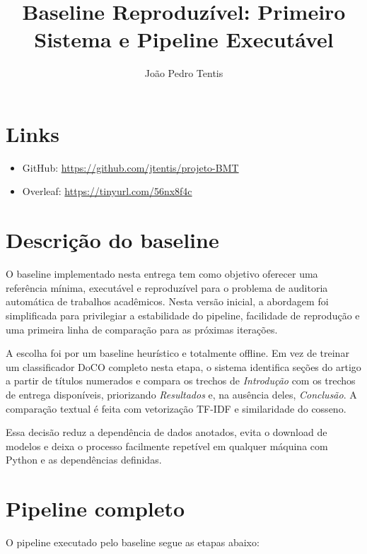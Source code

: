 \documentclass[12pt]{article}
\title{\textbf{Baseline Reproduzível: Primeiro Sistema e Pipeline Executável}}
\author{João Pedro Tentis\inst{1}}
\begin{document}
 

\maketitle

\section{Links}

\begin{itemize}
    \item GitHub: \url{https://github.com/jtentis/projeto-BMT}
    \item Overleaf: \url{https://tinyurl.com/56nx8f4c}
\end{itemize}

\section{Descrição do baseline}

O baseline implementado nesta entrega tem como objetivo oferecer uma referência mínima, executável e reproduzível para o problema de auditoria automática de trabalhos acadêmicos. Nesta versão inicial, a abordagem foi simplificada para privilegiar a estabilidade do pipeline, facilidade de reprodução e uma primeira linha de comparação para as próximas iterações.

A escolha foi por um baseline heurístico e totalmente offline. Em vez de treinar um classificador DoCO completo nesta etapa, o sistema identifica seções do artigo a partir de títulos numerados e compara os trechos de \textit{Introdução} com os trechos de entrega disponíveis, priorizando \textit{Resultados} e, na ausência deles, \textit{Conclusão}. A comparação textual é feita com vetorização TF-IDF e similaridade do cosseno.

Essa decisão reduz a dependência de dados anotados, evita o download de modelos e deixa o processo facilmente repetível em qualquer máquina com Python e as dependências definidas.

\section{Pipeline completo}

O pipeline executado pelo baseline segue as etapas abaixo:
\end{document}
